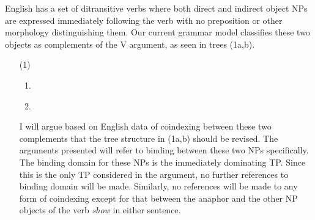 \documentclass[12pt]{article}
\begin{document}
\begin{enumerate}
English has a set of ditransitive verbs where both direct and indirect object NPs are expressed immediately following the verb with no preposition or other morphology distinguishing them. Our current grammar model classifies these two objects as complements of the V argument, as seen in trees (1a,b).\\

\pagebreak
\begin{itemize}
\item[(1)]
\begin{enumerate}[label=\alph*.]
\item \leavevmode\vadjust{\vspace{-\baselineskip}}\newline
{}\\
\pagebreak
\item \leavevmode\vadjust{\vspace{-\baselineskip}}\newline
{}

\end{enumerate}

I will argue based on English data of coindexing between these two complements that the tree structure in (1a,b) should be revised. The arguments presented will refer to binding between these two NPs specifically. The binding domain for these NPs is the immediately dominating TP. Since this is the only TP considered in the argument, no further references to binding domain will be made. Similarly, no references will be made to any form of coindexing except for that between the anaphor and the other NP objects of the verb \emph{show} in either sentence.


\end{itemize}
\end{enumerate}
\end{document}
